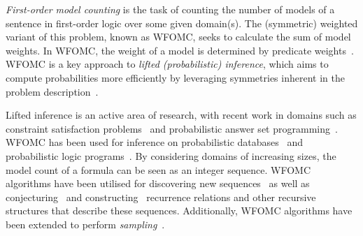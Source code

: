 \documentclass[letterpaper]{article} %
\theoremstyle{remark}
\theoremstyle{definition}
\begin{document}





\emph{First-order model counting} is the task of counting the number of models
of a sentence in first-order logic over some given domain(s). The (symmetric)
weighted variant of this problem, known as WFOMC, seeks to calculate the sum of
model weights. In WFOMC, the weight of a model is determined by predicate
weights~\cite{DBLP:conf/ijcai/BroeckTMDR11}. WFOMC is a key approach to
\emph{lifted (probabilistic) inference}, which aims to compute probabilities
more efficiently by leveraging symmetries inherent in the problem
description~\cite{DBLP:conf/ecai/Kersting12}.


Lifted inference is an active area of research, with recent work in domains such
as constraint satisfaction problems~\cite{DBLP:journals/jair/TotisDRK23} and
probabilistic answer set programming~\cite{DBLP:journals/ijar/AzzoliniR23}.
WFOMC has been used for inference on probabilistic
databases~\cite{DBLP:journals/debu/GribkoffSB14} and probabilistic logic
programs~\cite{DBLP:journals/ijar/RiguzziBZCL17}. By considering domains of
increasing sizes, the model count of a formula can be seen as an integer
sequence. WFOMC algorithms have been utilised for discovering new
sequences~\cite{DBLP:conf/ijcai/SvatosJT0K23} as well as
conjecturing~\cite{DBLP:conf/ilp/BarvinekB0ZK21} and
constructing~\cite{DBLP:conf/kr/DilkasB23} recurrence relations and other
recursive structures that describe these sequences. Additionally, WFOMC
algorithms have been extended to perform
\emph{sampling}~\cite{DBLP:conf/aaai/WangB0K22,DBLP:conf/lics/WangP0K23}.
\end{document}
